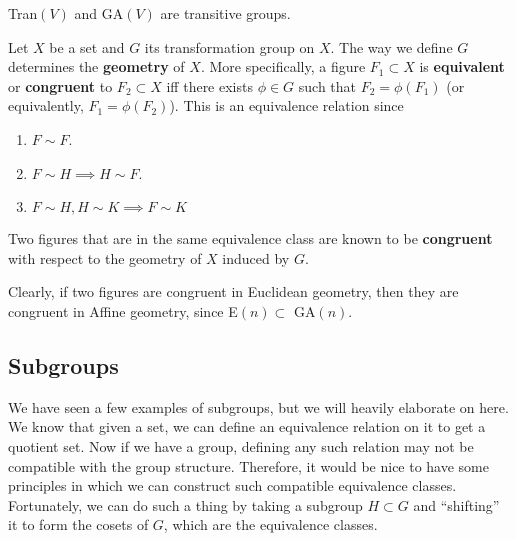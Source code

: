   \begin{example}
    Tran$(V)$ and GA$(V)$ are transitive groups. 
  \end{example}

  \begin{definition}
    Let $X$ be a set and $G$ its transformation group on $X$. The way we define $G$ determines the \textbf{geometry} of $X$. More specifically, a figure $F_{1} \subset X$ is \textbf{equivalent} or \textbf{congruent} to $F_{2} \subset X$ iff there exists $\phi \in G$ such that $F_{2} = \phi (F_{1})$ (or equivalently, $F_{1} = \phi (F_{2})$). This is an equivalence relation since
    \begin{enumerate}
      \item $F \sim F$. 
      \item $F \sim H \implies H \sim F$. 
      \item $F \sim H, H \sim K \implies F \sim K$
    \end{enumerate}
    Two figures that are in the same equivalence class are known to be \textbf{congruent} with respect to the geometry of $X$ induced by $G$. 
  \end{definition}

  Clearly, if two figures are congruent in Euclidean geometry, then they are congruent in Affine geometry, since E$(n) \subset$ GA$(n)$. 

\subsection{Subgroups}

  We have seen a few examples of subgroups, but we will heavily elaborate on here. We know that given a set, we can define an equivalence relation on it to get a quotient set. Now if we have a group, defining any such relation may not be compatible with the group structure. Therefore, it would be nice to have some principles in which we can construct such compatible equivalence classes. Fortunately, we can do such a thing by taking a subgroup $H \subset G$ and ``shifting'' it to form the cosets of $G$, which are the equivalence classes. 
  
